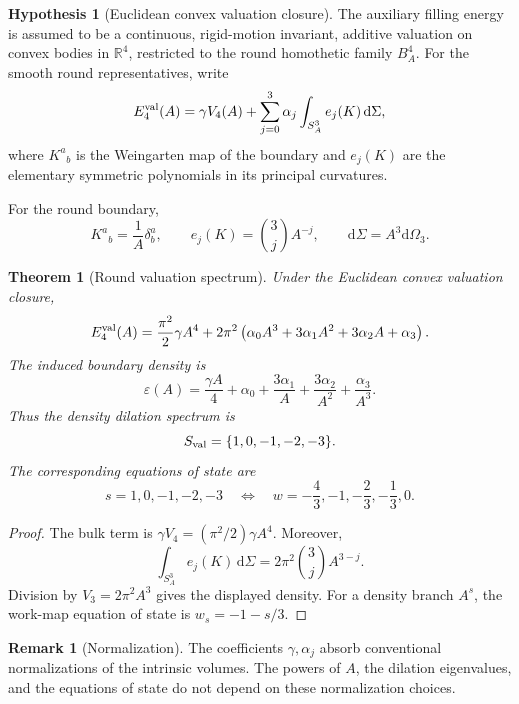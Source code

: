 \documentclass[aps,prd,preprint,onecolumn,nofootinbib,superscriptaddress,showkeys]{revtex4-2}
\numberwithin{equation}{section}
\theoremstyle{definition}
\newtheorem{hypothesis}{Hypothesis}[section]
\newtheorem{remark}{Remark}[section]
\theoremstyle{plain}
\newtheorem{theorem}{Theorem}[section]
\newcommand{\Sthree}{S^3}
\newcommand{\Bfour}{B^4}
\newcommand{\R}{\mathbb R}
\newcommand{\dd}{\mathrm d}
\begin{document}
\begin{hypothesis}[Euclidean convex valuation closure]
The auxiliary filling energy is assumed to be a continuous, rigid-motion invariant, additive valuation on convex bodies in \(\R^4\), restricted to the round homothetic family \(\Bfour_A\).  For the smooth round representatives, write
\begin{equation}
E_4^{\rm val}(A)
=
\gamma V_4(A)
+\sum_{j=0}^3\alpha_j
\int_{\Sthree_A}e_j(K)\,\dd\Sigma,
\end{equation}
where \(K^a{}_b\) is the Weingarten map of the boundary and \(e_j(K)\) are the elementary symmetric polynomials in its principal curvatures.
\end{hypothesis}

For the round boundary,
\begin{equation}
K^a{}_b=\frac1A\delta^a_b,
\qquad
e_j(K)=\binom3jA^{-j},
\qquad
\dd\Sigma=A^3\dd\Omega_3.
\end{equation}

\begin{theorem}[Round valuation spectrum]
Under the Euclidean convex valuation closure,
\begin{equation}
E_4^{\rm val}(A)
=
\frac{\pi^2}{2}\gamma A^4
+
2\pi^2
\left(
\alpha_0A^3+3\alpha_1A^2+3\alpha_2A+\alpha_3
\right).
\end{equation}
The induced boundary density is
\begin{equation}
\varepsilon(A)
=
\frac{\gamma A}{4}
+\alpha_0
+\frac{3\alpha_1}{A}
+\frac{3\alpha_2}{A^2}
+\frac{\alpha_3}{A^3}.
\end{equation}
Thus the density dilation spectrum is
\begin{equation}
S_{\rm val}=\{1,0,-1,-2,-3\}.
\end{equation}
The corresponding equations of state are
\begin{equation}
s=1,0,-1,-2,-3
\quad\Longleftrightarrow\quad
w=-\frac43,-1,-\frac23,-\frac13,0.
\end{equation}
\end{theorem}

\begin{proof}
The bulk term is \(\gamma V_4=(\pi^2/2)\gamma A^4\).  Moreover,
\[
\int_{\Sthree_A}e_j(K)\,\dd\Sigma
=
2\pi^2\binom3j A^{3-j}.
\]
Division by \(V_3=2\pi^2A^3\) gives the displayed density.  For a density branch \(A^s\), the work-map equation of state is \(w_s=-1-s/3\).
\end{proof}

\begin{remark}[Normalization]
The coefficients \(\gamma,\alpha_j\) absorb conventional normalizations of the intrinsic volumes.  The powers of \(A\), the dilation eigenvalues, and the equations of state do not depend on these normalization choices.
\end{remark}
\end{document}
